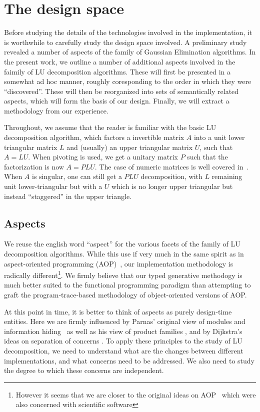 \documentclass[draft]{elsart}
\begin{document}
\section{The design space}\label{design}

Before studying the details of the technologies involved in the 
implementation, it is worthwhile to carefully study the design space involved.
A preliminary study~\cite{Carette06} revealed a number of aspects of the 
family of Gaussian Elimination algorithms.  In the present work, we outline
a number of additional aspects involved in the faimily of LU decomposition 
algorithms.  These will first be presented in a somewhat ad hoc manner, 
roughly coresponding to the order in which they were ``discovered''.  These
will then be reorganized into sets of semantically related aspects, which will
form the basis of our design.  Finally, we will extract a methodology from
our experience.  

Throughout, we assume that the reader is familiar with the basic LU
decomposition algorithm, which factors a invertible matrix $A$ into a unit
lower triangular matrix $L$ and (usually) an upper triangular matrix $U$,
such that $A = LU$.  When pivoting is used, we get a unitary matrix $P$ such
that the factorization is now $A = PLU$.  The case of numeric matrices is well
covered in~\cite{Golub-vanLoan}.  When $A$ is singular, one can still get
a $PLU$ decomposition, with $L$ remaining unit lower-triangular but with a
$U$ which is no longer upper triangular but instead ``staggered''
in the upper triangle.

\subsection{Aspects}

We reuse the english word ``aspect'' for the various facets of the family
of LU decomposition algorithms.  While this use if very much in the same 
spirit as in aspect-oriented programming (AOP)~\cite{kiczales97aspectoriented},
our implementation methodology is radically different\footnote{However it seems
that we are closer to the original ideas on AOP~\cite{709568,mendhekar97rg}
which were also concerned with scientific software}.  We firmly believe that
our typed generative methodogy is much better suited to the functional
programming paradigm than attempting to graft the program-trace-based
methodology of object-oriented versions of AOP.  

At this point in time, it is better to think of aspects as purely
design-time entities.  Here we are firmly influenced by Parnas' original
view of modules and information hiding~\cite{journals/cacm/parnas72a} as well
as his view of product families \cite{journals/tse/Parnas76}, and by
Dijkstra's ideas on separation of concerns \cite{EWD:EWD447}.
To apply these principles to the study of LU decomposition, we need
to understand what are the changes between different implementations, and 
what concerns need to be addressed.  We also need to study the degree
to which these concerns are independent.
\end{document}
